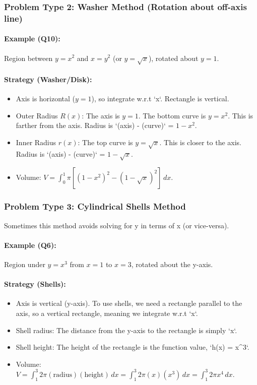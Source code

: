 \documentclass{article}
\begin{document}
\subsubsection{Problem Type 2: Washer Method (Rotation about off-axis line)}
\paragraph{Example (Q10):} Region between $y=x^2$ and $x=y^2$ (or $y=\sqrt{x}$), rotated about $y=1$.
\paragraph{Strategy (Washer/Disk):}
\begin{itemize}
    \item Axis is horizontal ($y=1$), so integrate w.r.t `x`. Rectangle is vertical.
    \item Outer Radius $R(x)$: The axis is $y=1$. The bottom curve is $y=x^2$. This is farther from the axis. Radius is `(axis) - (curve)` = $1-x^2$.
    \item Inner Radius $r(x)$: The top curve is $y=\sqrt{x}$. This is closer to the axis. Radius is `(axis) - (curve)` = $1-\sqrt{x}$.
    \item Volume: $V = \int_0^1 \pi [(1-x^2)^2 - (1-\sqrt{x})^2] \,dx$.
\end{itemize}

\subsubsection{Problem Type 3: Cylindrical Shells Method}
Sometimes this method avoids solving for y in terms of x (or vice-versa).
\paragraph{Example (Q6):} Region under $y=x^3$ from $x=1$ to $x=3$, rotated about the y-axis.
\paragraph{Strategy (Shells):}
\begin{itemize}
    \item Axis is vertical (y-axis). To use shells, we need a rectangle parallel to the axis, so a vertical rectangle, meaning we integrate w.r.t `x`.
    \item Shell radius: The distance from the y-axis to the rectangle is simply `x`.
    \item Shell height: The height of the rectangle is the function value, `h(x) = x^3`.
    \item Volume: $V = \int_1^3 2\pi (\text{radius})(\text{height}) \,dx = \int_1^3 2\pi (x)(x^3) \,dx = \int_1^3 2\pi x^4 \,dx$.
\end{itemize}
\end{document}
